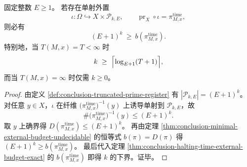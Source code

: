 \begin{corollary}[有界素数寄存器轴数的停机下界]\label{cor:conclusion-halting-time-prime-register-axis-lower-bound}
固定整数 \(E\ge 1\)。
若存在单射外置
\[
\iota:\Omega\hookrightarrow X\times\mathcal P_{k,E},
\qquad
\operatorname{pr}_X\circ\iota=\pi^{\mathrm{time}}_{M,x},
\]
则必有
\[
(E+1)^k\ \ge\ b\!\left(\pi^{\mathrm{time}}_{M,x}\right).
\]
特别地，当 \(T(M,x)=T<\infty\) 时
\[
k\ \ge\ \Bigl\lceil \log_{E+1}(T+1)\Bigr\rceil,
\]
而当 \(T(M,x)=\infty\) 时仅需 \(k\ge 0\)。
\end{corollary}
\begin{proof}
由定义 \ref{def:conclusion-truncated-prime-register} 有 \(|\mathcal P_{k,E}|=(E+1)^k\)。
对任意 \(y\in X\)，\(\iota\) 在纤维 \(\bigl(\pi^{\mathrm{time}}_{M,x}\bigr)^{-1}(y)\) 上诱导单射到 \(\mathcal P_{k,E}\)，故
\[
\#\bigl(\pi^{\mathrm{time}}_{M,x}\bigr)^{-1}(y)\le (E+1)^k.
\]
取 \(y\) 上确界得 \(D(\pi^{\mathrm{time}}_{M,x})\le (E+1)^k\)。
再由定理 \ref{thm:conclusion-minimal-external-budget-undecidable} 的恒等式 \(b(\pi)=D(\pi)\) 得 \((E+1)^k\ge b(\pi^{\mathrm{time}}_{M,x})\)。
最后代入定理 \ref{thm:conclusion-halting-time-external-budget-exact} 的 \(b(\pi^{\mathrm{time}}_{M,x})\) 即得 \(k\) 的下界。证毕。
\end{proof}

\endinput
